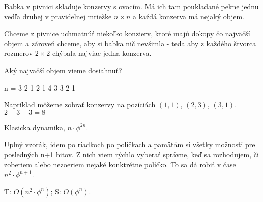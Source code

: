 
Babka v pivnici skladuje konzervy s ovocím. Má ich tam poukladané pekne jednu vedľa druhej v
pravidelnej mriežke $n \times n$ a každá konzerva má nejaký objem.

Chceme z pivnice uchmatnúť niekoľko konzierv, ktoré majú dokopy čo najväčší objem a zároveň chceme,
aby si babka nič nevšimla - teda aby z každého štvorca rozmerov $2 \times 2$ chýbala najviac jedna
konzerva. 

Aký najvačší objem vieme dosiahnuť?

\vstup
n = 3
2 1 2
1 4 3
3 2 1


\komentar
Napríklad môžeme zobrať konzervy na pozíciách $(1,1)$, $(2,3)$, $(3,1)$. $2+3+3 = 8$

\koniec

Klasicka dynamika, $n\cdot \phi^{2n}$.

Uplný vzorák, idem po riadkoch po políčkach a pamätám si všetky možnosti pre posledných n+1 bitov.
Z nich viem rýchlo vyberať správne, keď sa rozhodujem, či zoberiem alebo nezoeriem nejaké konktrétne
políčko. To sa dá robiť v čase $n^2 \cdot \phi^{n+1}$.

T: $O(n^2 \cdot \phi^n)$; S: $O(\phi^n)$.
